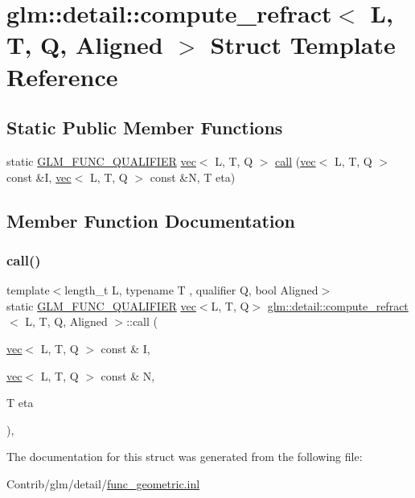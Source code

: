 \hypertarget{structglm_1_1detail_1_1compute__refract}{}\section{glm\+:\+:detail\+:\+:compute\+\_\+refract$<$ L, T, Q, Aligned $>$ Struct Template Reference}
\label{structglm_1_1detail_1_1compute__refract}
\subsection*{Static Public Member Functions}
\begin{DoxyCompactItemize}
\item 
static \mbox{\hyperlink{setup_8hpp_a33fdea6f91c5f834105f7415e2a64407}{G\+L\+M\+\_\+\+F\+U\+N\+C\+\_\+\+Q\+U\+A\+L\+I\+F\+I\+ER}} \mbox{\hyperlink{structglm_1_1vec}{vec}}$<$ L, T, Q $>$ \mbox{\hyperlink{structglm_1_1detail_1_1compute__refract_a17b1fde43c425c596ff032f5a92f15de}{call}} (\mbox{\hyperlink{structglm_1_1vec}{vec}}$<$ L, T, Q $>$ const \&I, \mbox{\hyperlink{structglm_1_1vec}{vec}}$<$ L, T, Q $>$ const \&N, T eta)
\end{DoxyCompactItemize}


\subsection{Member Function Documentation}
\mbox{\label{structglm_1_1detail_1_1compute__refract_a17b1fde43c425c596ff032f5a92f15de}} 
\subsubsection{\texorpdfstring{call()}{call()}}
{\footnotesize\ttfamily template$<$length\+\_\+t L, typename T , qualifier Q, bool Aligned$>$ \\
static \mbox{\hyperlink{setup_8hpp_a33fdea6f91c5f834105f7415e2a64407}{G\+L\+M\+\_\+\+F\+U\+N\+C\+\_\+\+Q\+U\+A\+L\+I\+F\+I\+ER}} \mbox{\hyperlink{structglm_1_1vec}{vec}}$<$L, T, Q$>$ \mbox{\hyperlink{structglm_1_1detail_1_1compute__refract}{glm\+::detail\+::compute\+\_\+refract}}$<$ L, T, Q, Aligned $>$\+::call (\begin{DoxyParamCaption}\item[{\mbox{\hyperlink{structglm_1_1vec}{vec}}$<$ L, T, Q $>$ const \&}]{I,  }\item[{\mbox{\hyperlink{structglm_1_1vec}{vec}}$<$ L, T, Q $>$ const \&}]{N,  }\item[{T}]{eta }\end{DoxyParamCaption})\hspace{0.3cm}{\ttfamily [inline]}, {\ttfamily [static]}}



The documentation for this struct was generated from the following file\+:\begin{DoxyCompactItemize}
\item 
Contrib/glm/detail/\mbox{\hyperlink{func__geometric_8inl}{func\+\_\+geometric.\+inl}}\end{DoxyCompactItemize}
